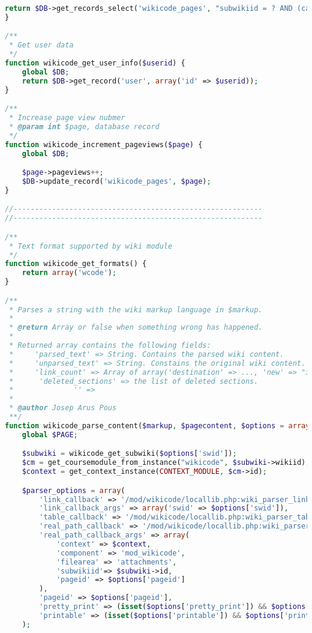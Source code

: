 \begin{lstlisting}[language=PHP]
    return $DB->get_records_select('wikicode_pages', "subwikiid = ? AND (cachedcontent LIKE ? OR title LIKE ?)", array($swid, '%'.$search.'%', '%'.$search.'%'));
}

/**
 * Get user data
 */
function wikicode_get_user_info($userid) {
    global $DB;
    return $DB->get_record('user', array('id' => $userid));
}

/**
 * Increase page view nubmer
 * @param int $page, database record
 */
function wikicode_increment_pageviews($page) {
    global $DB;

    $page->pageviews++;
    $DB->update_record('wikicode_pages', $page);
}

//----------------------------------------------------------
//----------------------------------------------------------

/**
 * Text format supported by wiki module
 */
function wikicode_get_formats() {
    return array('wcode');
}

/**
 * Parses a string with the wiki markup language in $markup.
 *
 * @return Array or false when something wrong has happened.
 *
 * Returned array contains the following fields:
 *     'parsed_text' => String. Contains the parsed wiki content.
 *     'unparsed_text' => String. Constains the original wiki content.
 *     'link_count' => Array of array('destination' => ..., 'new' => "is new?"). Contains the internal wiki links found in the wiki content.
 *      'deleted_sections' => the list of deleted sections.
 *              '' =>
 *
 * @author Josep Arus Pous
 **/
function wikicode_parse_content($markup, $pagecontent, $options = array()) {
    global $PAGE;

    $subwiki = wikicode_get_subwiki($options['swid']);
    $cm = get_coursemodule_from_instance("wikicode", $subwiki->wikiid);
    $context = get_context_instance(CONTEXT_MODULE, $cm->id);

    $parser_options = array(
        'link_callback' => '/mod/wikicode/locallib.php:wiki_parser_link',
        'link_callback_args' => array('swid' => $options['swid']),
        'table_callback' => '/mod/wikicode/locallib.php:wiki_parser_table',
        'real_path_callback' => '/mod/wikicode/locallib.php:wiki_parser_real_path',
        'real_path_callback_args' => array(
            'context' => $context,
            'component' => 'mod_wikicode',
            'filearea' => 'attachments',
            'subwikiid'=> $subwiki->id,
            'pageid' => $options['pageid']
        ),
        'pageid' => $options['pageid'],
        'pretty_print' => (isset($options['pretty_print']) && $options['pretty_print']),
        'printable' => (isset($options['printable']) && $options['printable'])
    );


\end{lstlisting}
